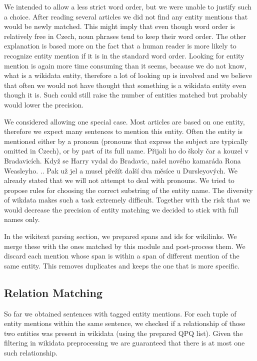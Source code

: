 We intended to allow a less strict word order, but we were unable to justify such a choice. After reading several articles we did not find any entity mentions that would be newly matched. This might imply that even though word order is relatively free in Czech, noun phrases tend to keep their word order. The other explanation is based more on the fact that a human reader is more likely to recognize entity mention if it is in the standard word order. Looking for entity mention is again more time consuming than it seems, because we do not know, what is a wikidata entity, therefore a lot of looking up is involved and we believe that often we would not have thought that something is a wikidata entity even though it is. Such  could still raise the number of entities matched but probably would lower the precision.

We considered allowing one special case. Most articles are based on one entity, therefore we expect many sentences to mention this entity. Often the entity is mentioned either by a pronoun (pronouns that express the subject are typically omitted in Czech), or by part of its full name.  Přijali ho do školy čar a kouzel v Bradavicích. Když se Harry vydal do Bradavic, našel nového kamaráda Rona Weasleyho. .. Pak už jel  a musel přežít další dva měsíce u Dursleyových. We already stated that we will not attempt to deal with pronouns. We tried to propose rules for choosing the correct substring of the entity name. The diversity of wikdata makes such a task extremely difficult. Together with the risk that we would decrease the precision of entity matching we decided to stick with full names only.

In the wikitext parsing section, we prepared spans and ids for wikilinks. We merge these with the ones matched by this module and post-process them. We discard each mention whose span is within a span of different mention of the same entity. This removes duplicates and keeps the one that is more specific.




\subsection{Relation Matching}
So far we obtained sentences with tagged entity mentions. For each tuple of entity mentions within the same sentence, we checked if a relationship of those two entities was present in wikidata (using the prepared QPQ list). Given the filtering in wikidata preprocessing we are guaranteed that there is at most one such relationship. 

